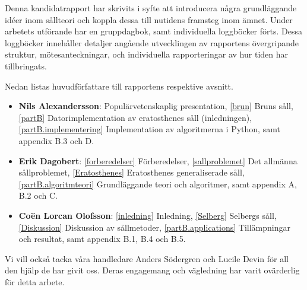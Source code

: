 Denna kandidatrapport har skrivits i syfte att introducera några grundläggande idéer inom sållteori och koppla dessa till nutidens framsteg inom ämnet.
Under arbetets utförande har en gruppdagbok, samt individuella loggböcker förts.
Dessa loggböcker innehåller detaljer angående utvecklingen av rapportens övergripande struktur, mötesanteckningar, och individuella rapporteringar av hur tiden har tillbringats.

Nedan listas huvudförfattare till rapportens respektive avsnitt.
\begin{itemize}
    \item \textbf{Nils Alexandersson}: 
        Populärvetenskaplig presentation,
        \ref{brun} Bruns såll,
        \ref{partB} Datorimplementation av eratosthenes såll (inledningen),
        \ref{partB.implementering} Implementation av algoritmerna i Python,
        samt appendix B.3 och D.
    \item \textbf{Erik Dagobert}: 
        \ref{forberedelser} Förberedelser, 
        \ref{sallproblemet} Det allmänna sållproblemet, 
        \ref{Eratosthenes} Eratosthenes generaliserade såll,
        \ref{partB.algoritmteori} Grundläggande teori och algoritmer,
        samt appendix A, B.2 och C.
    \item \textbf{Coën Lorcan Olofsson}:
        \ref{inledning} Inledning, 
        \ref{Selberg} Selbergs såll,
        \ref{Diskussion} Diskussion av sållmetoder,
        \ref{partB.applications} Tillämpningar och resultat,
        samt appendix B.1, B.4 och B.5.
\end{itemize}
Vi vill också tacka våra handledare Anders Södergren och Lucile Devin för all den hjälp de har givit oss. 
Deras engagemang och vägledning har varit ovärderlig för detta arbete.